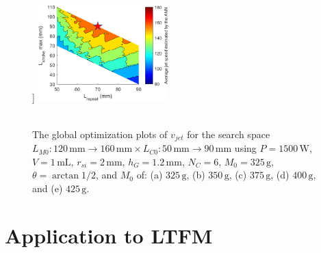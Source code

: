 \begin{figure}[!ht]
                ]{
                    \includegraphics[width=0.45\textwidth]{chap4/images2/400g.png}
                    \label{fig:chapter/rsm/LFSM/optimization/400}
                }
                \\
                \\
                \caption{
                    The global optimization plots of $v_{jet}$ for the search space $L_{M0}:120\,\mathrm{mm}\rightarrow 160\,\mathrm{mm} \times L_{C0}:50\,\mathrm{mm}\rightarrow 90\,\mathrm{mm}$ using $P=1500\,\mathrm{W}$, $V=1\,\mathrm{mL}$, $r_{si}=2\,\mathrm{mm}$, $h_G=1.2\,\mathrm{mm}$, $N_C=6$, $M_0=325\,\mathrm{g}$, $\theta = \arctan{1/2}$,  and $M_0$ of: (a) $325\,\mathrm{g}$, (b) $350\,\mathrm{g}$, (c) $375\,\mathrm{g}$, (d) $400\,\mathrm{g}$, and (e) $425\,\mathrm{g}$.
                }   \label{fig:chapter/rsm/LFSM/optimization search space result for differnt mass}
            \end{figure}
    
    
    \section{Application to LTFM}               \label{Chapter:RSM/LTFM}
    
